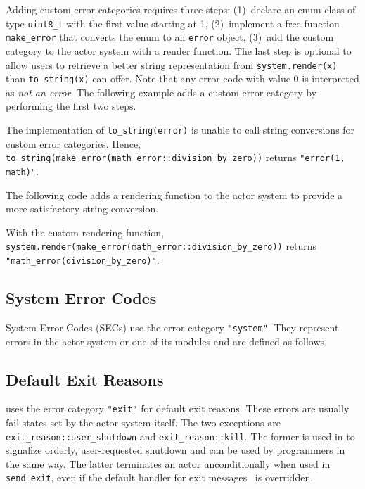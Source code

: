 Adding custom error categories requires three steps: (1)~declare an enum class of type \lstinline^uint8_t^ with the first value starting at 1, (2)~implement a free function \lstinline^make_error^ that converts the enum to an \lstinline^error^ object, (3)~add the custom category to the actor system with a render function. The last step is optional to allow users to retrieve a better string representation from \lstinline^system.render(x)^ than \lstinline^to_string(x)^ can offer. Note that any error code with value 0 is interpreted as \emph{not-an-error}. The following example adds a custom error category by performing the first two steps.



The implementation of \lstinline^to_string(error)^ is unable to call string conversions for custom error categories. Hence, \lstinline^to_string(make_error(math_error::division_by_zero))^ returns \lstinline^"error(1, math)"^.

The following code adds a rendering function to the actor system to provide a more satisfactory string conversion.



With the custom rendering function, \lstinline^system.render(make_error(math_error::division_by_zero))^ returns \lstinline^"math_error(division_by_zero)"^.

\clearpage
\subsection{System Error Codes}
\label{sec}

System Error Codes (SECs) use the error category \lstinline^"system"^. They represent errors in the actor system or one of its modules and are defined as follows.



\clearpage
\subsection{Default Exit Reasons}
\label{exit-reason}

\lib uses the error category \lstinline^"exit"^ for default exit reasons. These errors are usually fail states set by the actor system itself. The two exceptions are \lstinline^exit_reason::user_shutdown^ and \lstinline^exit_reason::kill^. The former is used in \lib to signalize orderly, user-requested shutdown and can be used by programmers in the same way. The latter terminates an actor unconditionally when used in \lstinline^send_exit^, even if the default handler for exit messages~ is overridden.


